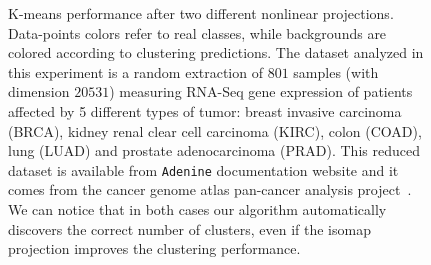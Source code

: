\documentclass[twoside,11pt]{article}
\makeatletter
\newcommand{\ade}{\texttt{Adenine}\@\xspace}
\makeatother
\begin{document}
\begin{figure}[h!] 
    \centering
    \hfill%
\caption{K-means performance after two different nonlinear projections. Data-points colors refer to real classes, while backgrounds are colored according to clustering predictions. The dataset analyzed in this experiment is a random extraction of $801$ samples (with dimension $20531$) measuring RNA-Seq gene expression of patients affected by 5 different types of tumor: breast invasive carcinoma (BRCA), kidney renal clear cell carcinoma (KIRC), colon  (COAD), lung  (LUAD) and prostate adenocarcinoma (PRAD). This reduced dataset is available from \ade documentation website and it comes from the cancer genome atlas pan-cancer analysis project~\citep{weinstein2013cancer}. We can notice that in both cases our algorithm automatically discovers the correct number of clusters, even if the isomap projection improves the clustering performance.} \label{fig:scatter}
\end{figure}




\end{document}
